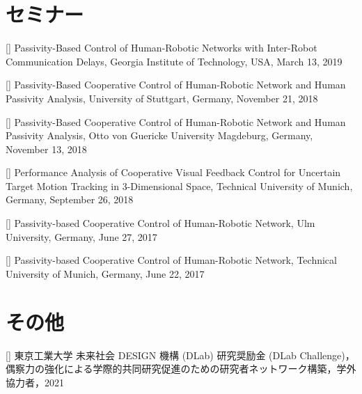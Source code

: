 \documentclass[letterpaper]{article}
\newcounter{seminar}
\newcounter{misc}
\begin{document}
\section*{セミナー}

[]  
  Passivity-Based Control of Human-Robotic Networks with Inter-Robot Communication Delays, 
  Georgia Institute of Technology, USA, March 13, 2019 \\
\addtocounter{seminar}{-1}

[]  
  Passivity-Based Cooperative Control of Human-Robotic Network and Human Passivity Analysis, 
  University of Stuttgart, Germany, November 21, 2018 \\
\addtocounter{seminar}{-1}

[] 
  Passivity-Based Cooperative Control of Human-Robotic Network and Human Passivity Analysis, 
  Otto von Guericke University Magdeburg, Germany, November 13, 2018 \\
\addtocounter{seminar}{-1}

[] 
  Performance Analysis of Cooperative Visual Feedback Control for Uncertain Target Motion Tracking in 3-Dimensional Space, 
  Technical University of Munich, Germany, September 26, 2018 \\
\addtocounter{seminar}{-1}

[] 
  Passivity-based Cooperative Control of Human-Robotic Network, 
  Ulm University, Germany, June 27, 2017 \\
\addtocounter{seminar}{-1}

[] 
  Passivity-based Cooperative Control of Human-Robotic Network, 
  Technical University of Munich, Germany, June 22, 2017 \\
\addtocounter{seminar}{-1}



\section*{その他}

[] 
  東京工業大学 未来社会 DESIGN 機構 (DLab) 研究奨励金 (DLab Challenge)， 
  偶察力の強化による学際的共同研究促進のための研究者ネットワーク構築，学外協力者，2021 \\
\addtocounter{misc}{-1}
\end{document}
